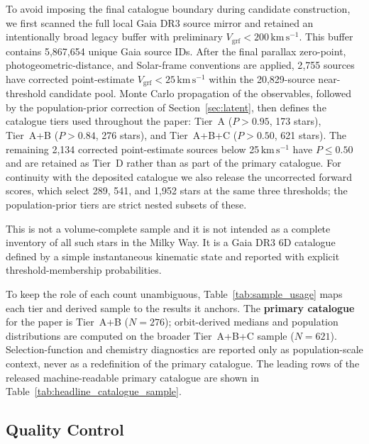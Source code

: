 \documentclass{aa}  %
\newcommand{\vgrf}{\ensuremath{V_{\mathrm{grf}}}\xspace}
\newcommand{\kms}{\ensuremath{\,\mathrm{km\,s^{-1}}}\xspace}
\begin{document}
To avoid imposing the final catalogue boundary during candidate
construction, we first scanned the full local Gaia DR3 source mirror and
retained an intentionally broad legacy buffer with preliminary
$\vgrf<200$\kms.  This buffer contains 5{,}867{,}654 unique Gaia source
IDs.  After the final parallax zero-point, photogeometric-distance, and
Solar-frame conventions are applied, 2{,}755 sources have corrected
point-estimate $\vgrf<25$\kms{} within the 20{,}829-source
near-threshold candidate pool.  Monte Carlo propagation of the
observables, followed by the population-prior correction of
Section~\ref{sec:latent}, then defines the catalogue tiers used
throughout the paper: Tier~A ($P>0.95$, 173 stars), Tier~A+B ($P>0.84$,
276 stars), and Tier~A+B+C ($P>0.50$, 621 stars).  The remaining
2{,}134 corrected point-estimate sources below 25\kms{} have $P\leq0.50$
and are retained as Tier~D rather than as part of the primary catalogue.
For continuity with the deposited catalogue we also release the
uncorrected forward scores, which select 289, 541, and 1{,}952 stars at
the same three thresholds; the population-prior tiers are strict nested
subsets of these.

This is not a volume-complete sample and it is not intended as a complete
inventory of all such stars in the Milky Way.  It is a Gaia DR3 6D
catalogue defined by a simple instantaneous kinematic state and reported
with explicit threshold-membership probabilities.



To keep the role of each count unambiguous, Table~\ref{tab:sample_usage}
maps each tier and derived sample to the results it anchors. The
\textbf{primary catalogue} for the paper is Tier~A+B ($N=276$);
orbit-derived medians and population distributions are computed on the
broader Tier~A+B+C sample ($N=621$). Selection-function and
chemistry diagnostics are reported only as population-scale context,
never as a redefinition of the primary catalogue.  The leading rows of
the released machine-readable primary catalogue are shown in
Table~\ref{tab:headline_catalogue_sample}.





\subsection{Quality Control} \label{sec:quality}
\end{document}
